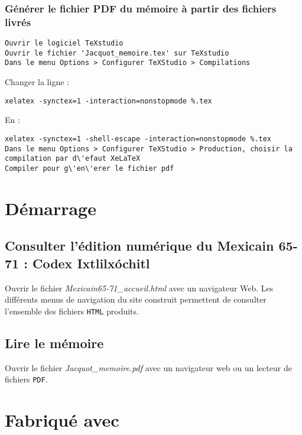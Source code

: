 \documentclass[a4paper,twoside,12pt]{article}
\begin{document}
\subsubsection{G\'en\'erer le fichier PDF du m\'emoire \`a partir des fichiers livr\'es}

\begin{lstlisting}
Ouvrir le logiciel TeXstudio
Ouvrir le fichier 'Jacquot_memoire.tex' sur TeXstudio
Dans le menu Options > Configurer TeXStudio > Compilations
\end{lstlisting}

Changer la ligne :

\begin{lstlisting}
xelatex -synctex=1 -interaction=nonstopmode %.tex
\end{lstlisting}

En :

\begin{lstlisting}
xelatex -synctex=1 -shell-escape -interaction=nonstopmode %.tex
Dans le menu Options > Configurer TeXStudio > Production, choisir la compilation par d\'efaut XeLaTeX
Compiler pour g\'en\'erer le fichier pdf
\end{lstlisting}

\section{D\'emarrage}

\subsection{Consulter l'\'edition num\'erique du Mexicain 65-71 : Codex Ixtlilx\'ochitl}

Ouvrir le fichier \emph{Mexicain65-71\_accueil.html} avec un navigateur Web. Les diff\'erents menus de navigation du site construit permettent de
consulter l'ensemble des fichiers \texttt{HTML} produits.

\subsection{Lire le m\'emoire}

Ouvrir le fichier \emph{Jacquot\_memoire.pdf} avec un navigateur web ou un lecteur de fichiers \texttt{PDF}.

\section{Fabriqu\'e avec}
\end{document}
